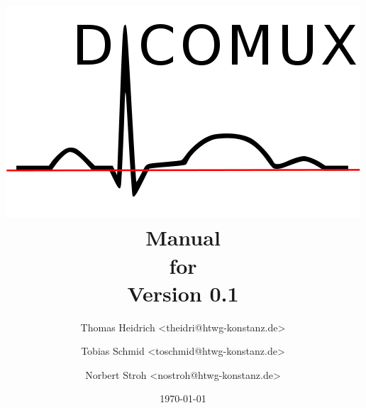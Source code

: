 %
%

\begin{titlepage}
\title{
	\centering
	\includegraphics[scale=0.8]{screens/logo_big.png}
	\medskip
	Manual\\
	for\\
	Version 0.1
}

\author {
Thomas Heidrich <theidri@htwg-konstanz.de> \and
Tobias Schmid <toschmid@htwg-konstanz.de> \and
Norbert Stroh <nostroh@htwg-konstanz.de>
}
\date{\today}
\maketitle
\end{titlepage}

%
%